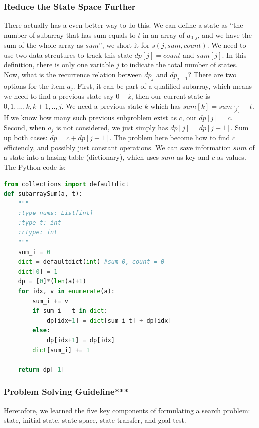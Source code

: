 \documentclass[../main.tex]{subfiles}
\begin{document}
\subsubsection{Reduce the State Space Further} There actually has a even better way to do this. We can define a state as ``the number of subarray that has sum equals to $t$ in an array of $a_{0,j}$, and we have the sum of the whole array as $sum$'', we short it for $s(j,sum,count)$. We need to use two data strcutures to track this state $dp[j]=count$ and $sum[j]$. In this definition, there is only one variable $j$ to indicate the total number of states. Now, what is the recurrence relation between $dp_j$ and $dp_{j-1}$? There are two options for the item $a_j$. First, it can be part of a qualified subarray, which means we need to find a previous state say $0-k$, then our current state is $0,1,..., k, k+1, ..,j$. We need a previous state $k$ which has $sum[k]=sum_[j]-t$. If we know how many such previous subproblem exist as $c$, our $dp[j]=c$. Second, when $a_j$ is not considered, we just simply has $dp[j]=dp[j-1]$. Sum up both cases: $dp=c+dp[j-1]$. The problem here become how to find $c$ efficiencly, and possibly just constant operations. We can save information $sum$ of a state into a hasing table (dictionary), which uses $sum$ as key and $c$ as values. The Python code is:
\begin{lstlisting}[language=Python]
from collections import defaultdict
def subarraySum(a, t):
    """
    :type nums: List[int]
    :type t: int
    :rtype: int
    """
    sum_i = 0
    dict = defaultdict(int) #sum 0, count = 0
    dict[0] = 1
    dp = [0]*(len(a)+1)
    for idx, v in enumerate(a):
        sum_i += v
        if sum_i - t in dict:
            dp[idx+1] = dict[sum_i-t] + dp[idx]
        else:
            dp[idx+1] = dp[idx]
        dict[sum_i] += 1

    return dp[-1]
\end{lstlisting}
\subsubsection{Problem Solving Guideline***} Heretofore, we learned the five key components of formulating a search problem: state, initial state, state space, state transfer, and goal test. 
\end{document}

